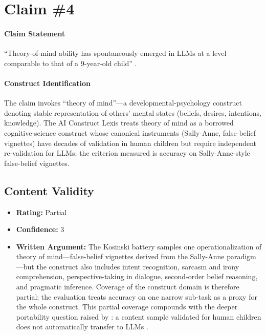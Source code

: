 \section{Claim \#4}

\paragraph{Claim Statement} ``Theory-of-mind ability has spontaneously emerged in LLMs at a level comparable to that of a 9-year-old child'' \citep{kosinski2024tom}.

\paragraph{Construct Identification} The claim invokes ``theory of mind''---a developmental-psychology construct denoting stable representation of others' mental states (beliefs, desires, intentions, knowledge). The AI Construct Lexis \citep{aiconstructlexis} treats theory of mind as a borrowed cognitive-science construct whose canonical instruments (Sally-Anne, false-belief vignettes) have decades of validation in human children but require independent re-validation for LLMs; the criterion measured is accuracy on Sally-Anne-style false-belief vignettes.

\subsection{Content Validity}
\begin{itemize}
    \item \textbf{Rating:} Partial
    \item \textbf{Confidence:} 3
    \item \textbf{Written Argument:} The Kosinski battery samples one operationalization of theory of mind---false-belief vignettes derived from the Sally-Anne paradigm---but the construct also includes intent recognition, sarcasm and irony comprehension, perspective-taking in dialogue, second-order belief reasoning, and pragmatic inference. Coverage of the construct domain is therefore partial; the evaluation treats accuracy on one narrow sub-task as a proxy for the whole construct. This partial coverage compounds with the deeper portability question raised by \citet{ullman2023llm}: a content sample validated for human children does not automatically transfer to LLMs \citep{salaudeen2025measurement}.
\end{itemize}


